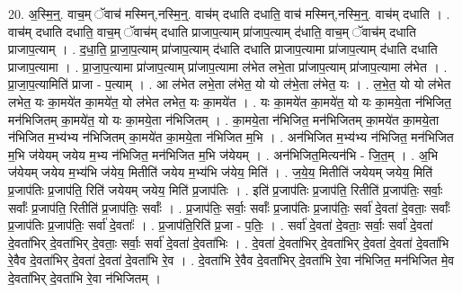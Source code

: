 \documentclass[17pt]{extarticle}
\begin{document}
20. अ॒स्मि॒न्॒. वाच॒म् ॅवाच॑ मस्मिन्,नस्मि॒न्॒. वाच॑म् दधाति दधाति॒ वाच॑ मस्मिन्,नस्मि॒न्॒. वाच॑म् दधाति । . वाच॑म् दधाति दधाति॒ वाच॒म् ॅवाच॑म् दधाति प्राजाप॒त्याम् प्रा॑जाप॒त्याम् द॑धाति॒ वाच॒म् ॅवाच॑म् दधाति प्राजाप॒त्याम् । . द॒धा॒ति॒ प्रा॒जा॒प॒त्याम् प्रा॑जाप॒त्याम् द॑धाति दधाति प्राजाप॒त्यामा प्रा॑जाप॒त्याम् द॑धाति दधाति प्राजाप॒त्यामा । . प्रा॒जा॒प॒त्यामा प्रा॑जाप॒त्याम् प्रा॑जाप॒त्यामा ल॑भेत लभे॒ता प्रा॑जाप॒त्याम् प्रा॑जाप॒त्यामा ल॑भेत । . प्रा॒जा॒प॒त्यामिति॑ प्राजा - प॒त्याम् । . आ ल॑भेत लभे॒ता ल॑भेत॒ यो यो ल॑भे॒ता ल॑भेत॒ यः । . ल॒भे॒त॒ यो यो ल॑भेत लभेत॒ यः का॒मये॑त का॒मये॑त॒ यो ल॑भेत लभेत॒ यः का॒मये॑त । . यः का॒मये॑त का॒मये॑त॒ यो यः का॒मये॒ता न॑भिजित॒ मन॑भिजितम् का॒मये॑त॒ यो यः का॒मये॒ता न॑भिजितम् । . का॒मये॒ता न॑भिजित॒ मन॑भिजितम् का॒मये॑त का॒मये॒ता न॑भिजित म॒भ्य॑भ्य न॑भिजितम् का॒मये॑त का॒मये॒ता न॑भिजित म॒भि । . अन॑भिजित म॒भ्य॑भ्य न॑भिजित॒ मन॑भिजित म॒भि ज॑येयम् जयेय म॒भ्य न॑भिजित॒ मन॑भिजित म॒भि ज॑येयम् । . अन॑भिजित॒मित्यन॑भि - जि॒त॒म् । . अ॒भि ज॑येयम् जयेय म॒भ्य॑भि ज॑येय॒ मितीति॑ जयेय म॒भ्य॑भि ज॑येय॒ मिति॑ । . ज॒ये॒य॒ मितीति॑ जयेयम् जयेय॒ मिति॑ प्र॒जाप॑तिः प्र॒जाप॑ति॒ रिति॑ जयेयम् जयेय॒ मिति॑ प्र॒जाप॑तिः । . इति॑ प्र॒जाप॑तिः प्र॒जाप॑ति॒ रितीति॑ प्र॒जाप॑तिः॒ सर्वाः॒ सर्वाः᳚ प्र॒जाप॑ति॒ रितीति॑ प्र॒जाप॑तिः॒ सर्वाः᳚ । . प्र॒जाप॑तिः॒ सर्वाः॒ सर्वाः᳚ प्र॒जाप॑तिः प्र॒जाप॑तिः॒ सर्वा॑ दे॒वता॑ दे॒वताः॒ सर्वाः᳚ प्र॒जाप॑तिः प्र॒जाप॑तिः॒ सर्वा॑ दे॒वताः᳚ । . प्र॒जाप॑ति॒रिति॑ प्र॒जा - प॒तिः॒ । . सर्वा॑ दे॒वता॑ दे॒वताः॒ सर्वाः॒ सर्वा॑ दे॒वता॑ दे॒वता॑भिर् दे॒वता॑भिर् दे॒वताः॒ सर्वाः॒ सर्वा॑ दे॒वता॑ दे॒वता॑भिः । . दे॒वता॑ दे॒वता॑भिर् दे॒वता॑भिर् दे॒वता॑ दे॒वता॑ दे॒वता॑भि रे॒वैव दे॒वता॑भिर् दे॒वता॑ दे॒वता॑ दे॒वता॑भि रे॒व । . दे॒वता॑भि रे॒वैव दे॒वता॑भिर् दे॒वता॑भि रे॒वा न॑भिजित॒ मन॑भिजित मे॒व दे॒वता॑भिर् दे॒वता॑भि रे॒वा न॑भिजितम् । \newline
\end{document}
